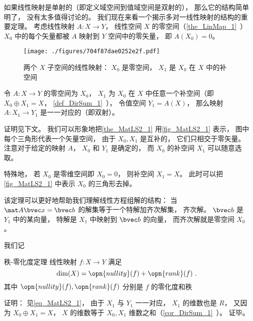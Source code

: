 
\begin{issues}
\issueTODO %
\end{issues}



如果线性映射是单射的（即定义域空间到值域空间是双射的）， 那么它的结构简单明了， 没有太多值得讨论的。 我们现在来看一个揭示多对一线性映射的结构的重要定理。 考虑线性映射 $A:X\to Y$， 线性空间 $X$ 的零空间（\autoref{the_LinMap_1}~） $X_0$ 中的每个矢量都被 $A$ 映射到 $Y$ 空间中的零矢量， 即 $A(X_0) = \qty{0}$。

\begin{figure}[ht]
\centering
\texttt{[image: ./figures/704f87dae0252e2f.pdf]}
\caption{两个 $X$ 子空间的线性映射： $X_0$ 是零空间， $X_1$ 是 $X_0$ 在 $X$ 中的补空间} \label{fig_MatLS2_1}
\end{figure}

\begin{theorem}{}\label{the_MatLS2_1}
令 $A:X \to Y$ 的零空间为 $X_0$， $X_1$ 为 $X_0$ 在 $X$ 中任意一个补空间（即 $X_0\oplus X_1 = X$， \autoref{def_DirSum_1}~）， 令值空间 $Y_1 = A(X)$， 那么映射 $A:X_1\to Y_1$ 是一一对应的（即双射）。
\end{theorem}
证明见下文。 我们可以形象地把\autoref{the_MatLS2_1} 用\autoref{fig_MatLS2_1} 表示， 图中每个三角形代表一个矢量空间， 由于 $X_0, X_1$ 是互补的， 它们只相交于零矢量。 注意对于给定的映射 $A$， $X_0$ 和 $Y_1$ 是确定的， 而 $X_0$ 的补空间 $X_1$ 可以随意选取。

特殊地， 若 $X_0$ 是零维空间即 $X_0 = \qty{0}$， 则补空间 $X_1 = X$。 此时可以把\autoref{fig_MatLS2_1} 中表示 $X_0$ 的三角形去掉。

该定理可以更好地帮助我们理解线性方程组解的结构： 当 $\mat A \bvec x = \bvec b$ 的解集等于一个特解加齐次解集， 齐次解。 $\bvec b$ 是 $Y_1$ 中的某向量， 特解是 $X_1$ 中映射到 $\bvec b$ 的向量， 而齐次解就是零空间 $X_0$。

我们记

\begin{corollary}{秩-零化度定理}\label{cor_MatLS2_1}
线性映射 $f: X \to Y$ 满足
\begin{equation}\label{eq_MatLS2_1}
\dim(X) = \opn{nullity}(f) + \opn{rank}(f)~.
\end{equation}
其中 $\opn{nullity}(f), \opn{rank}(f)$ 分别是 $f$ 的零化度和秩
\end{corollary}
证明： 见\autoref{eq_MatLS2_1}， 由于 $X_1$ 与 $Y_1$ 一一对应， $X_1$ 的维数也是 $R$， 又因为 $X_0\oplus X_1 = X$， $X$ 的维数等于 $X_0, X_1$ 维数之和（\autoref{cor_DirSum_1}~）。 证毕。

